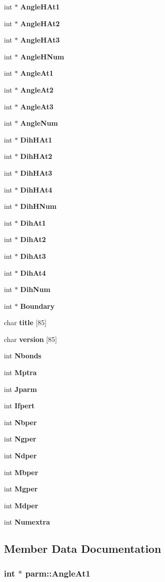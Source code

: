 \begin{CompactItemize}
int $\ast$ {\bf Angle\-HAt1}
\item 
int $\ast$ {\bf Angle\-HAt2}
\item 
int $\ast$ {\bf Angle\-HAt3}
\item 
int $\ast$ {\bf Angle\-HNum}
\item 
int $\ast$ {\bf Angle\-At1}
\item 
int $\ast$ {\bf Angle\-At2}
\item 
int $\ast$ {\bf Angle\-At3}
\item 
int $\ast$ {\bf Angle\-Num}
\item 
int $\ast$ {\bf Dih\-HAt1}
\item 
int $\ast$ {\bf Dih\-HAt2}
\item 
int $\ast$ {\bf Dih\-HAt3}
\item 
int $\ast$ {\bf Dih\-HAt4}
\item 
int $\ast$ {\bf Dih\-HNum}
\item 
int $\ast$ {\bf Dih\-At1}
\item 
int $\ast$ {\bf Dih\-At2}
\item 
int $\ast$ {\bf Dih\-At3}
\item 
int $\ast$ {\bf Dih\-At4}
\item 
int $\ast$ {\bf Dih\-Num}
\item 
int $\ast$ {\bf Boundary}
\item 
char {\bf title} [85]
\item 
char {\bf version} [85]
\item 
int {\bf Nbonds}
\item 
int {\bf Mptra}
\item 
int {\bf Jparm}
\item 
int {\bf Ifpert}
\item 
int {\bf Nbper}
\item 
int {\bf Ngper}
\item 
int {\bf Ndper}
\item 
int {\bf Mbper}
\item 
int {\bf Mgper}
\item 
int {\bf Mdper}
\item 
int {\bf Numextra}
\end{CompactItemize}


\subsection{Member Data Documentation}
\subsubsection{\setlength{\rightskip}{0pt plus 5cm}int $\ast$ parm::Angle\-At1}\label{structparm_m72}




